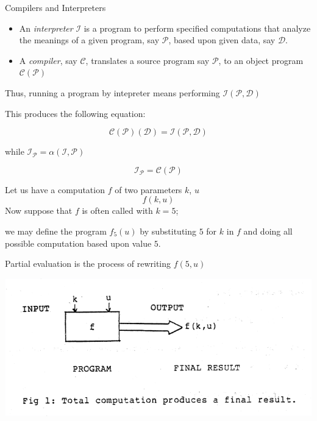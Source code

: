 \documentclass[aspectratio=169]{beamer}
\begin{document}
\begin{frame}{Compilers and Interpreters}

    \begin{itemize}
        \item 
            An \textit{interpreter} $\mathcal{I}$ is a program to perform
            specified computations that analyze the meanings of a given program, 
            say $\mathcal{P}$, based upon given data, say $\mathcal{D}$.

        \item 
            A \textit{compiler}, say $\mathcal{C}$, translates a source program
            say $\mathcal{P}$, to an object program $\mathcal{C}(\mathcal{P})$
        
    
    
    \end{itemize}
    
    Thus, 
    running a program by intepreter means performing $\mathcal{I}(\mathcal{P}, \mathcal{D})$
    
    
    This produces the following equation:
    
    \[
        \mathcal{C}(\mathcal{P})(\mathcal{D}) = \mathcal{I}(\mathcal{P},\mathcal{D})
    \]
    
    while $ \mathcal{I}_{\mathcal{P}} =  \alpha(\mathcal{I},\mathcal{P}) $
    
    \begin{equation}
    \mathcal{I}_{\mathcal{P}} =  \mathcal{C}(\mathcal{P})
    \end{equation}
    
    
\end{frame}

\begin{frame}{ex}
    Let us have a computation $f$ of two parameters $k$, $u$
    \[
        f(k,u)
    \]
    Now suppose that $f$ is often called with $k=5$; 
    
    we may define the program $f_5(u)$ by substituting $5$ for $k$ in $f$ 
    and doing all possible computation based upon value $5$.

    Partial evaluation is the process of rewriting $f(5,u)$
\end{frame}
 


\begin{frame}

    \includegraphics[width=\textwidth]{imgs/fig1.png}

\end{frame}
 
\end{document}
